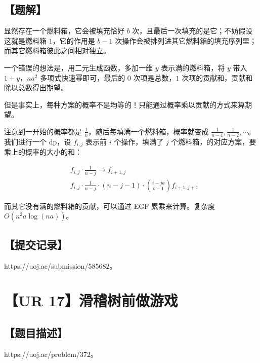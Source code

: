 \documentclass[UTF8,12pt,a4paper]{ctexart}
\begin{document}
	\subsection*{【题解】}
	
	显然存在一个燃料箱，它会被填充恰好 $b$ 次，且最后一次填充的是它；不妨假设这就是燃料箱 $1$，它的作用是 $b-1$ 次操作会被排列进其它燃料箱的填充序列里；而其它燃料箱彼此之间相对独立。
	
	一个错误的想法是，用二元生成函数，多加一维 $y$ 表示满的燃料箱，将 $y$ 带入 $1+y$，$na^2$ 多项式快速幂即可，最后的 $0$ 次项是总数，$1$ 次项的贡献和，贡献和除以总数得出期望。
	
	但是事实上，每种方案的概率不是均等的！只能通过概率乘以贡献的方式来算期望。
	
	注意到一开始的概率都是 $\frac 1{n}$，随后每填满一个燃料箱，概率就变成 $\frac 1{n-1},\frac 1{n-2},\cdots$。我们进行一个 dp，设 $f_{i,j}$ 表示前 $i$ 个操作，填满了 $j$ 个燃料箱，的对应方案，要乘上的概率的大小的和：
	
	$$
	\begin{aligned}
		&f_{i,j}\cdot \frac 1{n-j} \rightarrow f_{i+1,j} \\
		&f_{i,j}\cdot \frac 1{n-j}\cdot (n-j-1)\cdot \binom{i-ja}{b-1} f_{i+1,j+1}
	\end{aligned}
	$$
	
	而其它没有满的燃料箱的贡献，可以通过 EGF 累乘来计算。复杂度 $O(n^2a\log(na))$。
	
	\subsection*{【提交记录】}
	
	https://uoj.ac/submission/585682。
	
	
	\section*{【UR 17】滑稽树前做游戏}
	
	\subsection*{【题目描述】}
	
	https://uoj.ac/problem/372。
	
\end{document}
